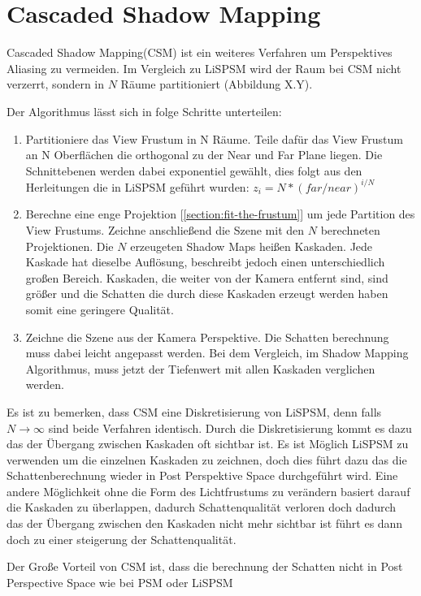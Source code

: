 \section{Cascaded Shadow Mapping}
\label{section:csm}
Cascaded Shadow Mapping(CSM) \cite{Engel2007}\cite{Zhang2006} ist ein weiteres Verfahren um Perspektives Aliasing zu vermeiden.
Im Vergleich zu LiSPSM wird der Raum bei CSM nicht verzerrt, sondern in $N$ Räume partitioniert (Abbildung X.Y).
\par
Der Algorithmus lässt sich in folge Schritte unterteilen:
\begin{enumerate}
  \item Partitioniere das View Frustum in N Räume. 
    Teile dafür das View Frustum an N Oberflächen die orthogonal zu der Near und Far Plane liegen.
    Die Schnittebenen werden dabei exponentiel gewählt, dies folgt aus den Herleitungen die in LiSPSM geführt wurden: 
    $z_{i} = N * (far / near)^{i/N}$
  \item Berechne eine enge Projektion [\ref{section:fit-the-frustum}] um jede Partition des View Frustums.
    Zeichne anschließend die Szene mit den $N$ berechneten Projektionen.
    Die $N$ erzeugeten Shadow Maps heißen Kaskaden.
    Jede Kaskade hat dieselbe Auflösung, beschreibt jedoch einen unterschiedlich großen Bereich.
    Kaskaden, die weiter von der Kamera entfernt sind, sind größer und die Schatten die durch diese Kaskaden erzeugt werden haben somit eine 
    geringere Qualität.

  \item Zeichne die Szene aus der Kamera Perspektive. 
    Die Schatten berechnung muss dabei leicht angepasst werden.
    Bei dem Vergleich, im Shadow Mapping Algorithmus, muss jetzt der Tiefenwert mit allen Kaskaden verglichen werden.
\end{enumerate}
Es ist zu bemerken, dass CSM eine Diskretisierung von LiSPSM, denn falls $N\rightarrow\infty$ sind beide Verfahren identisch. 
Durch die Diskretisierung kommt es dazu das der Übergang zwischen Kaskaden oft sichtbar ist.
Es ist Möglich LiSPSM zu verwenden um die einzelnen Kaskaden zu zeichnen, doch dies führt dazu das die Schattenberechnung wieder
in Post Perspektive Space durchgeführt wird. 
Eine andere Möglichkeit ohne die Form des Lichtfrustums zu verändern basiert darauf die Kaskaden zu überlappen,
dadurch Schattenqualität verloren doch dadurch das der Übergang zwischen den Kaskaden nicht mehr sichtbar ist 
führt es dann doch zu einer steigerung der Schattenqualität.
\par
Der Große Vorteil von CSM ist, dass die berechnung der Schatten nicht in Post Perspective Space wie bei PSM oder LiSPSM 
